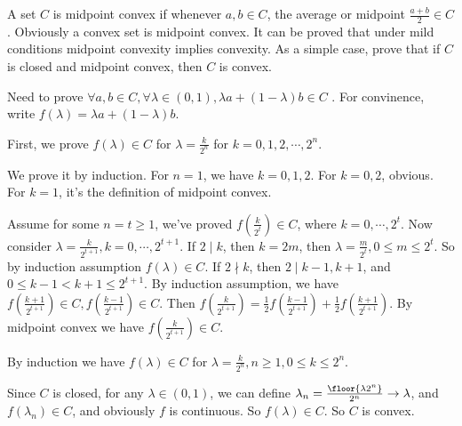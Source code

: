 \documentclass{ctexart}
\newif\ifpreface
\begin{document}
\large
\setlength{\baselineskip}{1.2em}
\ifpreface

\newgeometry{left=2cm,right=2cm,top=2cm,bottom=2cm}
\else
{}
\maketitle
\fi
\begin{problem}\label{pro:2.3}
  A set \(C\) is midpoint convex if whenever \(a,b \in C\), the average or midpoint \(\frac{a + b}{2} \in C \). Obviously a
  convex set is midpoint convex. It can be proved that under mild conditions midpoint convexity implies convexity.
  As a simple case, prove that if \(C \) is closed and midpoint convex, then \(C \) is convex.
\end{problem}
\begin{solution}
  Need to prove \(\forall a,b \in C,\forall \lambda \in (0,1) , \lambda a + (1 - \lambda) b \in C\) .
  For convinence, write \(f(\lambda) = \lambda a + (1- \lambda)b \).

  First, we prove \(f(\lambda) \in C \) for \(\lambda = \frac{k}{2^n} \) for \(k = 0,1,2,\cdots,2^n \).

  We prove it by induction. For \(n=1 \), we have \(k = 0,1,2 \). For \(k=0,2 \), obvious.
  For \(k = 1 \), it's the definition of midpoint convex.

  Assume for some \(n = t \geq 1 \), we've proved \(f(\frac{k}{2^t})\in C \), where \(k=0,\cdots,2^t \).
  Now consider \( \lambda = \frac{k}{2^{t + 1}} ,k = 0,\cdots,2^{t+1}\).
  If \(2 \mid k \), then \(k = 2m \), then \(\lambda = \frac{m}{2^t}, 0 \leq m \leq 2^t \). So by induction assumption \(f(\lambda) \in C \).
  If \(2 \nmid k \), then \(2 \mid k-1,k + 1\), and \( 0 \leq k-1 < k + 1 \leq 2^{t + 1} \). By induction assumption, we have \(f(\frac{k + 1}{2^{t + 1}}) \in C,  f( \frac{k-1}{2^{t + 1}} ) \in C \).
  Then \(f(\frac{k}{2^{t + 1}}) = \frac{1}{2} f(\frac{k-1}{2^{t + 1}} ) + \frac{1}{2}f(\frac{k + 1}{2^{t + 1}}) \).
  By midpoint convex we have \(f(\frac{k}{2^{t + 1}}) \in C \).

  By induction we have \(f(\lambda) \in C \) for \(\lambda = \frac{k}{2^n}, n \geq 1, 0 \leq k \leq 2^n \).

  Since \(C \) is closed, for any \(\lambda \in (0,1) \), we can define \(\lambda_n = \frac{\floor{\lambda 2^n}}{2^n} \to \lambda \), and \(f(\lambda_n) \in C \),
  and obviously \(f \) is continuous. So \(f(\lambda) \in C \). So \(C \) is convex.
\end{solution}
\end{document}
